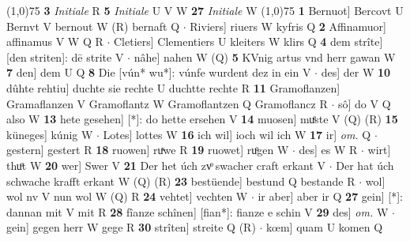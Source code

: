 \documentclass[8pt,a4paper,notitlepage]{article}
\begin{document}
\begin{table}[ht]
\begin{minipage}[t]{0.5\linewidth}
\line(1,0){75} \newline
\textbf{3} \textit{Initiale} R  \textbf{5} \textit{Initiale} U V W  \textbf{27} \textit{Initiale} W  \newline
\line(1,0){75} \newline
\textbf{1} Bernuot] Bercovt U Bernvt V bernout W (R) bernaft Q  $\cdot$ Riviers] riuers W kyfris Q \textbf{2} Affinamuor] affinamus V W Q R  $\cdot$ Cletiers] Clementiers U kleiters W klirs Q \textbf{4} dem strîte] [den striten]: dē strite V  $\cdot$ nâhe] nahen W (Q) \textbf{5} KVnig artus vnd herr gawan W \textbf{7} den] dem U Q \textbf{8} Die [vún* wu*]: vúnfe wurdent dez in ein V  $\cdot$ des] der W \textbf{10} dûhte rehtiu] duchte sie rechte U duchtte rechte R \textbf{11} Gramoflanzen] Gramaflanzen V Gramoflantz W Gramoflantzen Q Gramoflancz R  $\cdot$ sô] do V Q also W \textbf{13} hete gesehen] [*]: do hette ersehen V \textbf{14} muosen] muͤste V (Q) (R) \textbf{15} küneges] kúnig W  $\cdot$ Lotes] lottes W \textbf{16} ich wil] ioch wil ich W \textbf{17} ir] \textit{om.} Q  $\cdot$ gestern] gestert R \textbf{18} ruowen] ruͯwe R \textbf{19} ruowet] ruͦgen W  $\cdot$ des] es W R  $\cdot$ wirt] thuͦt W \textbf{20} wer] Swer V \textbf{21} Der het úch zvͦ swacher craft erkant V  $\cdot$ Der hat úch schwache krafft erkant W (Q) (R) \textbf{23} bestüende] bestund Q bestande R  $\cdot$ wol] wol nv V nun wol W (Q) R \textbf{24} vehtet] vechten W  $\cdot$ ir aber] aber ir Q \textbf{27} gein] [*]: dannan mit V mit R \textbf{28} fîanze schînen] [fian*]: fianze e schin V \textbf{29} des] \textit{om.} W  $\cdot$ gein] gegen herr W gege R \textbf{30} strîten] streite Q (R)  $\cdot$ kœm] quam U komen Q \newline
\end{minipage}
\end{table}
\end{document}
